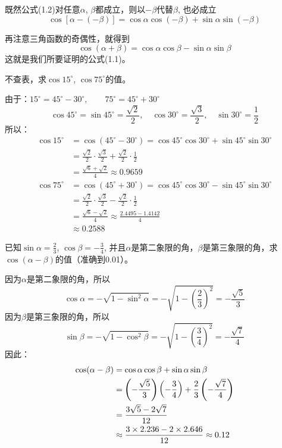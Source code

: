 既然公式(1.2)对任意$\alpha$, $\beta$都成立，则以$-\beta$代替$\beta$, 也必成立
    \[ \cos [\alpha-(-\beta)] =\cos\alpha\cos(-\beta)+\sin\alpha\sin(-\beta)\]

再注意三角函数的奇偶性，就得到
\[ \cos(\alpha+\beta) =\cos\alpha\cos\beta-\sin\alpha\sin\beta\]
这就是我们所要证明的公式(1.1)。

\begin{example}
不查表，求$\cos15^{\circ}$, $\cos75^{\circ}$的值。
\end{example}

\begin{solution}
由于：$15^{\circ}=45^{\circ}-30^{\circ},\qquad 75^{\circ}=45^{\circ}+30^{\circ}$
\[\cos 45^{\circ}=\sin 45^{\circ}=\frac{\sqrt{2}}{2},\quad \cos 30^{\circ}=\frac{\sqrt{3}}{2},\quad \sin 30^{\circ}=\frac{1}{2} \]
所以：
\[\begin{split}
\cos15^{\circ}&=\cos(45^{\circ}-30^{\circ})=\cos 45^{\circ}\cos30^{\circ}+\sin 45^{\circ}\sin30^{\circ}\\
&=\frac{\sqrt{2}}{2}\cdot \frac{\sqrt{3}}{2}+\frac{\sqrt{2}}{2}\cdot \frac{1}{2}\\
&=\frac{\sqrt{6}+\sqrt{2}}{4}\approx 0.9659 
\end{split}\]
\[\begin{split}
\cos75^{\circ}&=\cos(45^{\circ}+30^{\circ})=\cos 45^{\circ}\cos30^{\circ}-\sin 45^{\circ}\sin30^{\circ}\\
&=\frac{\sqrt{2}}{2}\cdot \frac{\sqrt{3}}{2}-\frac{\sqrt{2}}{2}\cdot \frac{1}{2}\\
&=\frac{\sqrt{6}-\sqrt{2}}{4}\approx \frac{2.4495-1.4142}{4}\\
&\approx 0.2588 
\end{split}\]
\end{solution}

\begin{example}
    已知$\sin\alpha=\frac{2}{3}$, $\cos\beta=-\frac{3}{4}$, 并且$\alpha$是第二象限的角，$\beta$是第三象限的角，求$\cos(\alpha-\beta)$的值（准确到0.01）。
\end{example}

\begin{solution}
因为$\alpha$是第二象限的角，所以
\[\cos\alpha=-\sqrt{1-\sin^2\alpha}=-\sqrt{1-\left(\frac{2}{3}\right)^2}=-\frac{\sqrt{5}}{3}\]
因为$\beta$是第三象限的角，所以
\[\sin\beta=-\sqrt{1-\cos^2\beta}=-\sqrt{1-\left(\frac{3}{4}\right)^2}=-\frac{\sqrt{7}}{4}\]
因此：
\[\begin{split}
    \cos (\alpha-\beta) &=\cos\alpha\cos\beta+\sin\alpha\sin\beta\\
    &=\left(-\dfrac{\sqrt{5}}{3}\right)\left(-\dfrac{3}{4}\right)+\dfrac{2}{3}\left(-\dfrac{\sqrt{7}}{4}\right)\\
    &=\dfrac{3\sqrt{5}-2\sqrt{7}}{12}\\
    &\approx \dfrac{3\times 2.236-2\times 2.646}{12}\approx 0.12
\end{split}\]
\end{solution}


